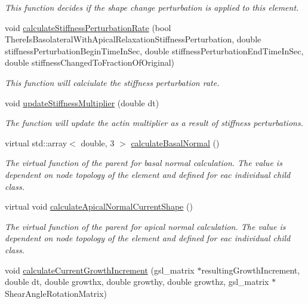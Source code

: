 \begin{DoxyCompactItemize}
\begin{DoxyCompactList}\small\item\em This function decides if the shape change perturbation is applied to this element. \end{DoxyCompactList}\item 
void \hyperlink{classShapeBase_aef460b84dc469f89742af7c19411454f}{calculate\+Stiffness\+Perturbation\+Rate} (bool There\+Is\+Basolateral\+With\+Apical\+Relaxation\+Stiffness\+Perturbation, double stiffness\+Perturbation\+Begin\+Time\+In\+Sec, double stiffness\+Perturbation\+End\+Time\+In\+Sec, double stiffness\+Changed\+To\+Fraction\+Of\+Original)
\begin{DoxyCompactList}\small\item\em This function will calciulate the stiffness perturbation rate. \end{DoxyCompactList}\item 
\hypertarget{classShapeBase_a4eb97c0c1a988e77126809745b191c02}{}void \hyperlink{classShapeBase_a4eb97c0c1a988e77126809745b191c02}{update\+Stiffness\+Multiplier} (double dt)\label{classShapeBase_a4eb97c0c1a988e77126809745b191c02}

\begin{DoxyCompactList}\small\item\em The function will update the actin multiplier as a result of stiffness perturbations. \end{DoxyCompactList}\item 
\hypertarget{classShapeBase_a12eb565639695764997f8cb81e801055}{}virtual std\+::array$<$ double, 3 $>$ \hyperlink{classShapeBase_a12eb565639695764997f8cb81e801055}{calculate\+Basal\+Normal} ()\label{classShapeBase_a12eb565639695764997f8cb81e801055}

\begin{DoxyCompactList}\small\item\em The virtual function of the parent for basal normal calculation. The value is dependent on node topology of the element and defined for eac individual child class. \end{DoxyCompactList}\item 
\hypertarget{classShapeBase_a82400cae7963721655c867547caf6a76}{}virtual void \hyperlink{classShapeBase_a82400cae7963721655c867547caf6a76}{calculate\+Apical\+Normal\+Current\+Shape} ()\label{classShapeBase_a82400cae7963721655c867547caf6a76}

\begin{DoxyCompactList}\small\item\em The virtual function of the parent for apical normal calculation. The value is dependent on node topology of the element and defined for eac individual child class. \end{DoxyCompactList}\item 
\hypertarget{classShapeBase_ac2c05f660fb3d68482c8ba751b68b2ed}{}void \hyperlink{classShapeBase_ac2c05f660fb3d68482c8ba751b68b2ed}{calculate\+Current\+Growth\+Increment} (gsl\+\_\+matrix $\ast$resulting\+Growth\+Increment, double dt, double growthx, double growthy, double growthz, gsl\+\_\+matrix $\ast$Shear\+Angle\+Rotation\+Matrix)\label{classShapeBase_ac2c05f660fb3d68482c8ba751b68b2ed}


\end{DoxyCompactItemize}
